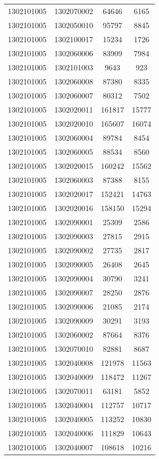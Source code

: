 \begin{longtable}[h]{llcc}
		1302101005 & 1302070002 & 64646 & 6165\\
		1302101005 & 1302050010 & 95797 & 8845\\
		1302101005 & 1302100017 & 15234 & 1726\\
		1302101005 & 1302060006 & 83909 & 7984\\
		1302101005 & 1302101003 & 9643 & 923\\
		1302101005 & 1302060008 & 87380 & 8335\\
		1302101005 & 1302060007 & 80312 & 7502\\
		1302101005 & 1302020011 & 161817 & 15777\\
		1302101005 & 1302020010 & 165607 & 16074\\
		1302101005 & 1302060004 & 89784 & 8454\\
		1302101005 & 1302060005 & 88534 & 8560\\
		1302101005 & 1302020015 & 160242 & 15562\\
		1302101005 & 1302060003 & 87388 & 8155\\
		1302101005 & 1302020017 & 152421 & 14763\\
		1302101005 & 1302020016 & 158150 & 15294\\
		1302101005 & 1302090001 & 25309 & 2586\\
		1302101005 & 1302090003 & 27815 & 2915\\
		1302101005 & 1302090002 & 27735 & 2817\\
		1302101005 & 1302090005 & 26408 & 2645\\
		1302101005 & 1302090004 & 30790 & 3241\\
		1302101005 & 1302090007 & 28250 & 2876\\
		1302101005 & 1302090006 & 21085 & 2174\\
		1302101005 & 1302090009 & 30291 & 3193\\
		1302101005 & 1302060002 & 87664 & 8376\\
		1302101005 & 1302070010 & 82881 & 8687\\
		1302101005 & 1302040008 & 121978 & 11563\\
		1302101005 & 1302040009 & 118472 & 11267\\
		1302101005 & 1302070011 & 63181 & 5852\\
		1302101005 & 1302040004 & 112757 & 10717\\
		1302101005 & 1302040005 & 113252 & 10830\\
		1302101005 & 1302040006 & 111829 & 10643\\
		1302101005 & 1302040007 & 108618 & 10216\\

\end{longtable}
